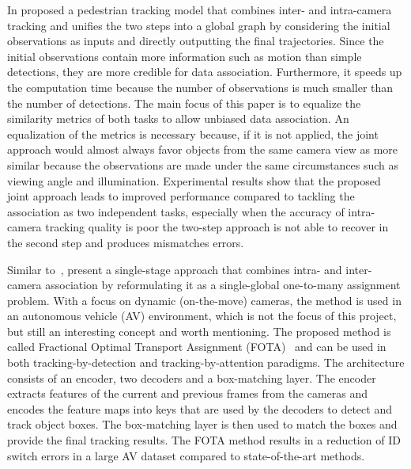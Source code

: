 In \citeyear{Chen17a} \textcite{Chen17a} proposed a pedestrian tracking model that combines inter- and intra-camera tracking and unifies the two steps into a global graph by considering the initial observations as inputs and directly outputting the final trajectories. Since the initial observations contain more information such as motion than simple detections, they are more credible for data association. Furthermore, it speeds up the computation time because the number of observations is much smaller than the number of detections. The main focus of this paper is to equalize the similarity metrics of both tasks to allow unbiased data association. An equalization of the metrics is necessary because, if it is not applied, the joint approach would almost always favor objects from the same camera view as more similar because the observations are made under the same circumstances such as viewing angle and illumination. Experimental results show that the proposed joint approach leads to improved performance compared to tackling the association as two independent tasks, especially when the accuracy of intra-camera tracking quality is poor the two-step approach is not able to recover in the second step and produces mismatches errors.

Similar to~\cite{Chen17a}, \citeauthor{Nguyen22b} present a single-stage approach that combines intra- and inter-camera association by reformulating it as a single-global one-to-many assignment problem. With a focus on dynamic (on-the-move) cameras, the method is used in an autonomous vehicle (AV) environment, which is not the focus of this project, but still an interesting concept and worth mentioning. The proposed method is called Fractional Optimal Transport Assignment (FOTA)~\cite{Nguyen22b} and can be used in both tracking-by-detection and tracking-by-attention paradigms. The architecture consists of an encoder, two decoders and a box-matching layer. The encoder extracts features of the current and previous frames from the cameras and encodes the feature maps into keys that are used by the decoders to detect and track object boxes. The box-matching layer is then used to match the boxes and provide the final tracking results. The FOTA method results in a reduction of ID switch errors in a large AV dataset compared to state-of-the-art methods.


